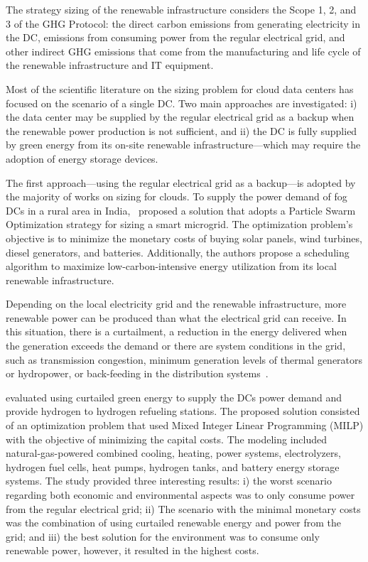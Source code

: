 The strategy sizing of the renewable infrastructure considers the Scope 1, 2, and 3 of the GHG Protocol: the direct carbon emissions from generating electricity in the DC, emissions from consuming power from the regular electrical grid, and other indirect GHG emissions that come from the manufacturing and life cycle of the renewable infrastructure and IT equipment.


Most of the scientific literature on the sizing problem for cloud data centers has focused on the scenario of a single DC. Two main approaches are investigated: i) the data center may be supplied by the regular electrical grid as a backup when the renewable power production is not sufficient, and ii) the DC is fully supplied by green energy from its on-site renewable infrastructure---which may require the adoption of energy storage devices.


The first approach---using the regular electrical grid as a backup---is adopted by the majority of works on sizing for clouds. To supply the power demand of fog DCs in a rural area in India,~\citet{padma2021_fogdcs_rural} proposed a solution that adopts a Particle Swarm Optimization strategy for sizing a smart microgrid. The optimization problem's objective is to minimize the monetary costs of buying solar panels, wind turbines, diesel generators, and batteries. Additionally, the authors propose a scheduling algorithm to maximize low-carbon-intensive energy utilization from its local renewable infrastructure. %

Depending on the local electricity grid and the renewable infrastructure, more renewable power can be produced than what the electrical grid can receive. In this situation, there is a curtailment, a reduction in the energy delivered when the generation exceeds the demand or there are system conditions in the grid, such as transmission congestion, minimum generation levels of thermal generators or hydropower, or back-feeding in the distribution systems~\cite{curtailment_def_2021}. 

\citet{Niaz2022_curtailment} evaluated using curtailed green energy to supply the DCs power demand and provide hydrogen to hydrogen refueling stations. The proposed solution consisted of an optimization problem that used Mixed Integer Linear Programming (MILP) with the objective of minimizing the capital costs. The modeling included natural-gas-powered combined cooling, heating, power systems, electrolyzers, hydrogen fuel cells, heat pumps, hydrogen tanks, and battery energy storage systems. The study provided three interesting results: i) the worst scenario regarding both economic and environmental aspects was to only consume power from the regular electrical grid; ii) The scenario with the minimal monetary costs was the combination of using curtailed renewable energy and power from the grid; and iii) the best solution for the environment was to consume only renewable power, however, it resulted in the highest costs.


